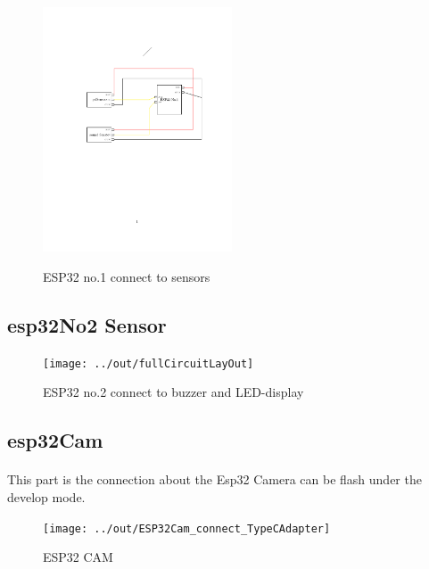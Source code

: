 \documentclass[12pt, a4, utf8]{report}        %
\begin{document}
    \begin{figure}[h]
        \caption{ESP32 no.1 connect to sensors}
        \centering
        \includegraphics[width=0.5\textwidth]{../out/ESP32_No1_connect_Sensor}
        \label{fig:figure2}
    \end{figure}


    \subsection{esp32No2 Sensor}\label{subsec:esp32no2-sensor}

        \begin{figure}[h]
        \caption{ESP32 no.2 connect to buzzer and LED-display}\label{fig:figure3}
        \centering
        \texttt{[image: ../out/fullCircuitLayOut]}

    \end{figure}

    \subsection{esp32Cam }\label{subsec:esp32cam}

    \paragraph{}
    This part is the connection about the Esp32 Camera can be flash under the develop mode.

    \begin{figure}[h]

        \caption{ESP32 CAM}\label{fig:figure4}
        \centering
        \texttt{[image: ../out/ESP32Cam\_connect\_TypeCAdapter]}

    \end{figure}



    
    
\end{document}
